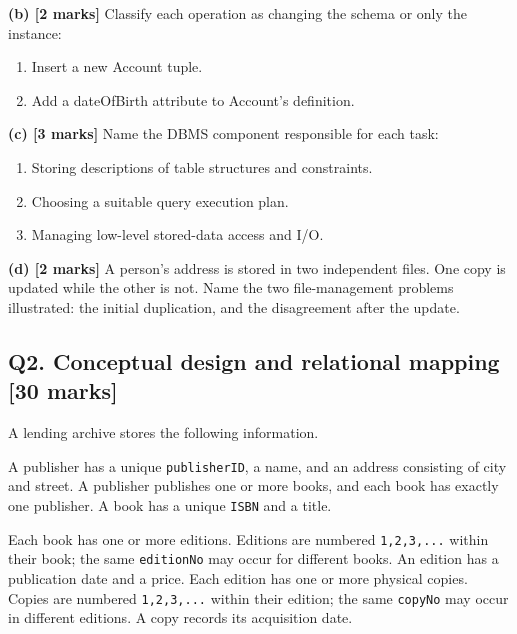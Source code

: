 \textbf{(b) {[}2 marks{]}} Classify each operation as changing the schema or only the instance:

\begin{enumerate}
\def\labelenumi{\arabic{enumi}.}
\tightlist
\item
  Insert a new Account tuple.
\item
  Add a dateOfBirth attribute to Account's definition.
\end{enumerate}

\textbf{(c) {[}3 marks{]}} Name the DBMS component responsible for each task:

\begin{enumerate}
\def\labelenumi{\arabic{enumi}.}
\tightlist
\item
  Storing descriptions of table structures and constraints.
\item
  Choosing a suitable query execution plan.
\item
  Managing low-level stored-data access and I/O.
\end{enumerate}

\textbf{(d) {[}2 marks{]}} A person's address is stored in two independent files. One copy is updated while the other is not. Name the two file-management problems illustrated: the initial duplication, and the disagreement after the update.

\subsection{Q2. Conceptual design and relational mapping {[}30 marks{]}}\label{practice_paper_2-q2.-conceptual-design-and-relational-mapping-30-marks}

A lending archive stores the following information.

A publisher has a unique \texttt{publisherID}, a name, and an address consisting of city and street. A publisher publishes one or more books, and each book has exactly one publisher. A book has a unique \texttt{ISBN} and a title.

Each book has one or more editions. Editions are numbered \texttt{1,\allowbreak{}2,\allowbreak{}3,\allowbreak{}.\allowbreak{}.\allowbreak{}.\allowbreak{}} within their book; the same \texttt{editionNo} may occur for different books. An edition has a publication date and a price. Each edition has one or more physical copies. Copies are numbered \texttt{1,\allowbreak{}2,\allowbreak{}3,\allowbreak{}.\allowbreak{}.\allowbreak{}.\allowbreak{}} within their edition; the same \texttt{copyNo} may occur in different editions. A copy records its acquisition date.

